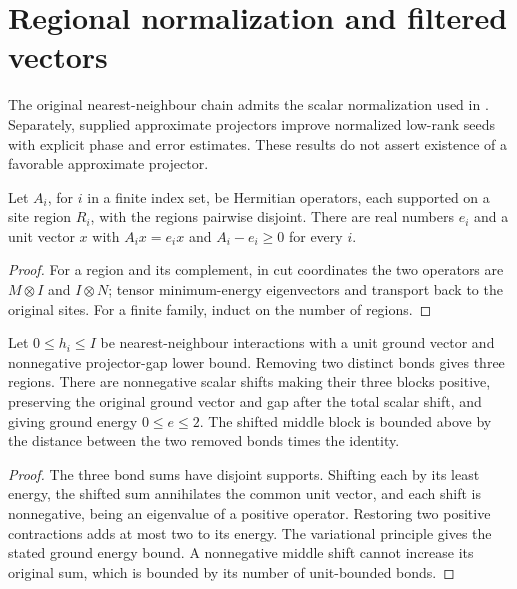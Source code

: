 \section{Regional normalization and filtered vectors}

The original nearest-neighbour chain admits the scalar normalization used in
\cite[Section~6.1]{Arad2013AreaLaw}. Separately, supplied approximate projectors
improve normalized low-rank seeds with explicit phase and error estimates.
These results do not assert existence of a favorable approximate projector.

\begin{lemma}
    \label{lem:aklv_disjoint_ground_shifts}
    \leanok
    Let $A_i$, for $i$ in a finite index set, be Hermitian operators, each
    supported on a site region $R_i$, with the regions pairwise disjoint.
    There are real numbers $e_i$ and a unit vector $x$ with $A_ix=e_ix$ and
    $A_i-e_i\ge0$ for every $i$.
\end{lemma}
\begin{proof}\leanok
    For a region and its complement, in cut coordinates the two operators are
    $M\otimes I$ and $I\otimes N$; tensor minimum-energy eigenvectors and
    transport back to the original sites. For a finite family, induct on the
    number of regions.
\end{proof}

\begin{lemma}
    \label{lem:aklv_original_chain_normalization}
    \leanok
    Let $0\le h_i\le I$ be nearest-neighbour interactions with a unit ground
    vector and nonnegative projector-gap lower bound. Removing two distinct
    bonds gives three regions. There are nonnegative scalar shifts making
    their three blocks positive, preserving the original ground vector and
    gap after the total scalar shift, and giving ground energy $0\le e\le2$.
    The shifted middle block is bounded above by the distance between the
    two removed bonds times the identity.
\end{lemma}
\begin{proof}\leanok
    The three bond sums have disjoint supports. Shifting each by its least
    energy, the shifted sum annihilates the common unit vector, and each shift
    is nonnegative, being an eigenvalue of a positive operator. Restoring two positive contractions adds at
    most two to its energy. The variational principle gives the stated ground
    energy bound. A nonnegative middle shift cannot increase its original sum,
    which is bounded by its number of unit-bounded bonds.
\end{proof}


